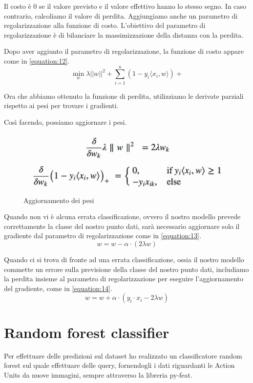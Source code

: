Il costo è 0 se il valore previsto e il valore eﬀettivo hanno lo stesso segno. In caso contrario, calcoliamo il valore di perdita. Aggiungiamo anche un parametro di regolarizzazione alla funzione di costo. L'obiettivo del
parametro di regolarizzazione è di bilanciare la massimizzazione della distanza con la perdita. 

Dopo aver aggiunto il parametro di regolarizzazione, la funzione di costo appare come in \ref{equation:12}.
\begin{equation}
    \min_w \lambda ||w||^2 + \sum_{i=1}^{n} (1 - y_i \langle x_i, w \rangle) +
    \label{equation:12}
\end{equation}

Ora che abbiamo ottenuto la funzione di perdita, utilizziamo le derivate parziali rispetto ai pesi per trovare i gradienti. 

Così facendo, possiamo aggiornare i pesi.
\begin{figure}
    \centering
    \includegraphics[width=0.9\linewidth]{images/image32.jpeg}
    \caption{Aggiornamento dei pesi}
\end{figure}

Quando non vi è alcuna errata classificazione, ovvero il nostro modello prevede correttamente la classe del nostro punto dati, sarà necessario aggiornare solo il gradiente dal parametro di regolarizzazione come in \ref{equation:13}.
\begin{equation}
    w = w - \alpha \cdot (2\lambda w)
    \label{equation:13}
\end{equation}

Quando ci si trova di fronte ad una errata classificazione, ossia il nostro modello commette un errore sulla previsione della classe del nostro punto dati, includiamo la perdita insieme al parametro di regolarizzazione per eseguire l'aggiornamento del gradiente, come in \ref{equation:14}.
\begin{equation}
    w = w + \alpha \cdot (y_i \cdot x_i - 2\lambda w)
    \label{equation:14}
\end{equation}

\section{Random forest classifier}
Per effettuare delle predizioni sul dataset ho realizzato un classificatore random forest sul quale effettuare delle query, fornendogli i dati riguardanti le Action Units da nuove immagini, sempre attraverso la libreria py-feat.

